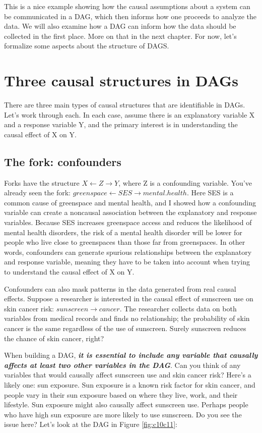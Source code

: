 \documentclass[
]{book}
\begin{document}
This is a nice example showing how the causal assumptions about a system can be communicated in a DAG, which then informs how one proceeds to analyze the data. We will also examine how a DAG can inform how the data should be collected in the first place. More on that in the next chapter. For now, let's formalize some aspects about the structure of DAGS.

\section{Three causal structures in DAGs}\label{three-causal-structures-in-dags}

There are three main types of causal structures that are identifiable in DAGs. Let's work through each. In each case, assume there is an explanatory variable X and a response variable Y, and the primary interest is in understanding the causal effect of X on Y.

\subsection{The fork: confounders}\label{the-fork-confounders}

Forks have the structure \(X \gets Z \to Y\), where Z is a confounding variable. You've already seen the fork: \(greenspace \gets SES \to mental.health\). Here SES is a common cause of greenspace and mental health, and I showed how a confounding variable can create a noncausal association between the explanatory and response variables. Because SES increases greenspace access and reduces the likelihood of mental health disorders, the risk of a mental health disorder will be lower for people who live close to greenspaces than those far from greenspaces. In other words, confounders can generate spurious relationships between the explanatory and response variable, meaning they have to be taken into account when trying to understand the causal effect of X on Y.

Confounders can also mask patterns in the data generated from real causal effects. Suppose a researcher is interested in the causal effect of sunscreen use on skin cancer risk: \(sunscreen \to cancer\). The researcher collects data on both variables from medical records and finds no relationship; the probability of skin cancer is the same regardless of the use of sunscreen. Surely sunscreen reduces the chance of skin cancer, right?

When building a DAG, \textbf{\emph{it is essential to include any variable that causally affects at least two other variables in the DAG}}. Can you think of any variables that would causally affect sunscreen use and skin cancer risk? Here's a likely one: sun exposure. Sun exposure is a known risk factor for skin cancer, and people vary in their sun exposure based on where they live, work, and their lifestyle. Sun exposure might also causally affect sunscreen use. Perhaps people who have high sun exposure are more likely to use sunscreen. Do you see the issue here? Let's look at the DAG in Figure \ref{fig:c10c11}:
\end{document}
